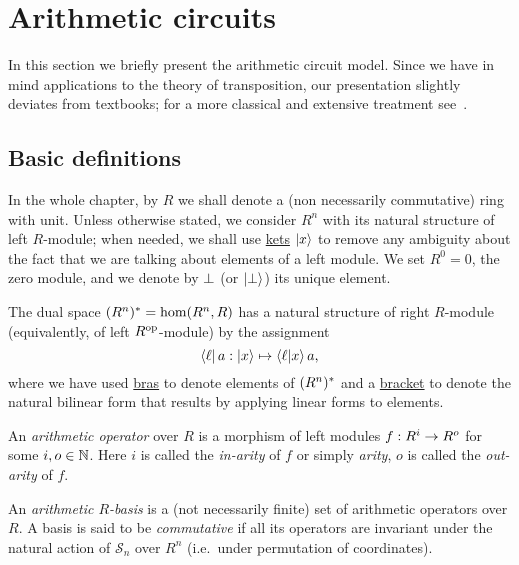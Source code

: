 

\section{Arithmetic circuits}
\label{sec:circuits}

In this section we briefly present the
arithmetic circuit model. Since we have in mind applications to the
theory of transposition, our presentation slightly deviates from
textbooks; for a more classical and extensive treatment
see~\cite{burgisser+clausen-shokrollahi,vollmer}.

\subsection{Basic definitions}
In the whole chapter, by $R$ we shall denote a (non necessarily
commutative) ring with unit. Unless otherwise stated, we consider
$R^n$ with its natural structure of left $R$-module; when needed, we
shall use \hyperref[sec:linear-algebra:bra-ket]{kets} $\left\lvert x \right\rangle$ to
remove any ambiguity about the fact that we are talking about elements
of a left module.  We set $R^0=0$, the zero module, and we denote by
$\perp$ (or $\left\lvert \perp \right\rangle$) its unique element.

The dual space $(R^n)^\ast=\hom(R^n,R)$ has a natural structure of
right $R$-module (equivalently, of left $R^{\mathrm{op}}$-module) by the
assignment
\begin{equation}
  \label{eq:232}
  \left\langle \ell \right\rvert a : \left\lvert x \right\rangle \mapsto \left\langle \ell \middle| x \right\rangle a
  \text{,}
\end{equation}
where we have used \hyperref[sec:linear-algebra:bra-ket]{bras} to
denote elements of $(R^n)^\ast$ and a
\hyperref[sec:linear-algebra:bra-ket]{bracket} to denote the natural
bilinear form that results by applying linear forms to elements.

\begin{definition}
  An \emph{arithmetic operator} over $R$ is
  a morphism of left modules $f:R^i\rightarrow R^o$ for some $i,o\in\mathbb{N}$. Here
  $i$ is called the \emph{in-arity} of $f$ or simply
  \emph{arity}, $o$ is called the \emph{out-arity} of $f$.
\end{definition}

\begin{definition}
  An \emph{arithmetic $R$-basis} is a (not
  necessarily finite) set of arithmetic operators over $R$.  A basis
  is said to be \emph{commutative}
  if all its operators are invariant under the natural action of
  $\mathcal{S}_n$ over $R^n$ (i.e.\ under permutation of coordinates).
\end{definition}

